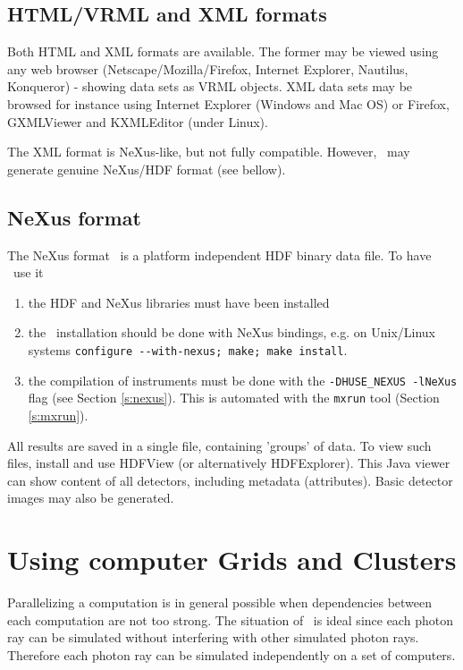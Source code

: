 \subsection{HTML/VRML and XML formats}
  

Both HTML and XML formats are available. The former may be viewed using any web browser (Netscape/Mozilla/Firefox, Internet Explorer, Nautilus, Konqueror) - showing data sets as VRML objects. XML data sets may be browsed for instance using Internet Explorer (Windows and Mac OS) or Firefox, GXMLViewer and KXMLEditor (under Linux).

The XML format is NeXus-like, but not fully compatible. However, \MCX\ may generate genuine NeXus/HDF format (see bellow).

\subsection{NeXus format}
  
\label{r:nexus}

The NeXus format~\cite{nexus_webpage} is a platform independent HDF binary data file. To have \MCX\ use it
\begin{enumerate}
\item the HDF and NeXus libraries must have been installed
\item the \MCX\ installation should be done with NeXus bindings, e.g. on Unix/Linux systems \verb+configure --with-nexus; make; make install+.
\item  the compilation of instruments must be done with the \verb+-DHUSE_NEXUS -lNeXus+ flag (see Section \ref{s:nexus}). This is automated with the \verb+mxrun+ tool (Section \ref{s:mxrun}).
\end{enumerate}
All results are saved in a single file, containing 'groups' of data. To view such files, install and use HDFView (or alternatively HDFExplorer). This Java viewer can show content of all detectors, including metadata (attributes). Basic detector images may also be generated.

\section{Using computer Grids and Clusters}
\label{s:run-mpi}

Parallelizing a computation is in general possible when dependencies between
  each computation are not too strong. The situation of \MCX\ is
  ideal since each photon ray can be simulated without interfering with
  other simulated photon rays. Therefore each photon ray can be simulated
  independently on a set of computers.
  
